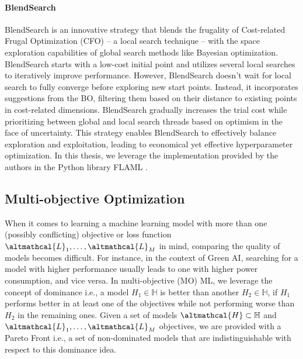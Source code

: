 \paragraph{BlendSearch}
BlendSearch is an innovative strategy that blends the frugality of Cost-related Frugal Optimization (CFO) -- a local search technique -- with the space exploration capabilities of global search methods like Bayesian optimization.
BlendSearch starts with a low-cost initial point and utilizes several local searches to iteratively improve performance. However, BlendSearch doesn't wait for local search to fully converge before exploring new start points. Instead, it incorporates suggestions from the BO, filtering them based on their distance to existing points in cost-related dimensions. BlendSearch gradually increases the trial cost while prioritizing between global and local search threads based on optimism in the face of uncertainty. This strategy enables BlendSearch to effectively balance exploration and exploitation, leading to economical yet effective hyperparameter optimization.
In this thesis, we leverage the implementation provided by the authors in the Python library FLAML \cite{wang2021flaml}.


\subsection{Multi-objective Optimization}


When it comes to learning a machine learning model with more than one (possibly conflicting) objective or loss function $\altmathcal{L}_1, \dots, \altmathcal{L}_M$ in mind, comparing the quality of models becomes difficult.
For instance, in the context of Green AI, searching for a model with higher performance usually leads to one with higher power consumption, and vice versa.
In multi-objective (MO) ML, we leverage the concept of dominance i.e., a model $H_1 \in \mathbb{H}$ is better than another $H_2 \in \mathbb{H}$, if $H_1$ performs better in at least one of the objectives while not performing worse than $H_2$ in the remaining ones.
Given a set of models $\altmathcal{H} \subset \mathbb{H}$ and $\altmathcal{L}_1, \dots, \altmathcal{L}_M$ objectives, we are provided with a Pareto Front i.e., a set of non-dominated models that are indistinguishable with respect to this dominance idea.

